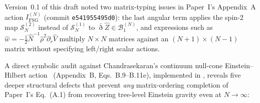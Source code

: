 \documentclass[11pt]{article}
\newcommand{\calB}{\mathcal{B}}
\newcommand{\calS}{\mathcal{S}}
\newcommand{\bareth}{\bar{\eth}}
\begin{document}
Version~0.1 of this draft noted two matrix-typing issues in Paper~I's Appendix~A action $I_{\mathrm{FSG}}^{(N)}$ (commit \texttt{e541955495d0}): the last angular term applies the spin-2 map $\calS_N^{(2)}$ instead of $\calS_N^{(1)}$ to $\bareth \widehat{Z} \in \calB_1^{(N)}$, and expressions such as $\widehat{w} = -\frac{1}{2}\widehat{N}^{-1}\widehat{\rho}^2\partial_r\widehat{V}$ multiply $N\times N$ matrices against an $(N+1)\times(N-1)$ matrix without specifying left/right scalar actions.

A direct symbolic audit against Chandrasekaran's continuum null-cone Einstein--Hilbert action~\cite{Chandrasekaran2026} (Appendix~B, Eqs.~B.9--B.11e), implemented in , reveals five deeper structural defects that prevent \emph{any} matrix-ordering completion of Paper~I's Eq.~(A.1) from recovering tree-level Einstein gravity even at $N\to\infty$:
\end{document}
